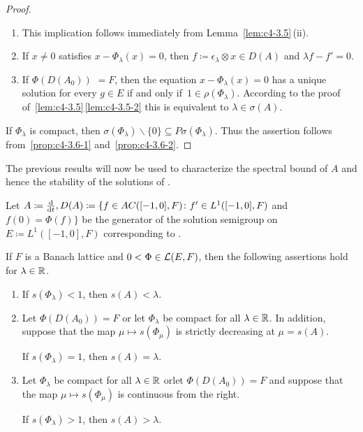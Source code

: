 \begin{proof}
\begin{enumerate}[\upshape (i), wide, labelindent=.25em] 
\item 
This implication follows immediately from Lemma~\ref{lem:c4-3.5}\,(ii).

\item 
If\/ $x \neq 0$ satisfies $x - \Phi_{\lambda}(x) = 0$, then $f \coloneq  \epsilon_{\lambda} \otimes x \in D(A)$ and $\lambda f - f' = 0$.

\item 
If\/ $\Phi(D(A_{0}))$ $= F$,  then the equation $x - \Phi_{\lambda}(x) = 0$ has a
unique solution for every $g \in E$ if and only if\, $1 \in \rho(\Phi_{\lambda})$. 
According to the proof of~\ref{lem:c4-3.5}\,\ref{lem:c4-3.5-2} this is equivalent to $\lambda \in \sigma(A)$.
\end{enumerate}
If\/ $\Phi_{\lambda}$ is compact, then $\sigma(\Phi_{\lambda})\backslash\{0\} \subseteq P\sigma(\Phi_{\lambda})$. Thus the assertion follows from~\ref{prop:c4-3.6-1} and~\ref{prop:c4-3.6-2}.
\end{proof}
The previous results will now be used to characterize the spectral bound of\/ $A$ and hence the stability of the solutions of .
\begin{theorem}\label{thm:c4-3.7}
Let $A \coloneqq \frac{\mathop{}\!\mathrm{d}{}}{\mathop{}\!\mathrm{d}{t}}, D(A) \coloneqq \{f \in AC([-1,0],F) \colon f' \in L^{1}([-1,0],F)$ and $f(0) = \Phi(f)\}$ be the generator of the solution semigroup on $E \coloneqq L^{1}([-1,0],F)$ corresponding to . 

If\/ $F$ is a Banach lattice and $0 < \Phi \in \mathcal{L}(E,F)$, then the following assertions hold for $\lambda \in \mathbb{R}$.
\begin{enumerate}[\upshape (i)]
\item \label{thm:c4-3.7-1}
If\/ $s(\Phi_{\lambda}) < 1$, then $s(A) < \lambda$.
\item \label{thm:c4-3.7-2}
Let $\Phi(D(A_{0})) = F$ or let $\Phi_{\lambda}$ be compact for all $\lambda \in \mathbb{R}$. 
In addition, suppose that the map $\mu \mapsto s(\Phi_\mu)$ is strictly decreasing at $\mu = s(A)$. 

If\/ $s(\Phi_{\lambda}) = 1$, then $s(A) = \lambda$.
\item \label{thm:c4-3.7-3}
Let $\Phi_{\lambda}$ be compact for all $\lambda \in \mathbb{R}$ \quad or\quad let $\Phi(D(A_{0})) = F$ and suppose that the map $\mu \mapsto s(\Phi_\mu)$ is continuous from the right. 

If\/ $s(\Phi_{\lambda}) > 1$, then $s(A) > \lambda$.
\end{enumerate}
\end{theorem}
